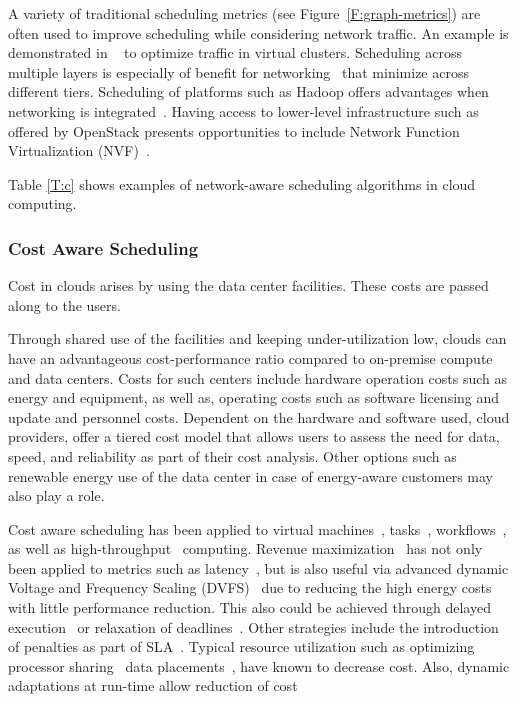 \documentclass[final,5p,times,twocolumn]{elsarticle}
\begin{document}
A variety of traditional scheduling metrics (see Figure~\ref{F:graph-metrics}) are often used to improve scheduling while considering network traffic. An example is demonstrated in ~\cite{yu2017survivable} to optimize traffic in virtual clusters. Scheduling across multiple layers is especially of benefit for networking~\cite{bi2015sla} that minimize across different tiers. Scheduling of platforms such as Hadoop offers advantages when networking is integrated~\cite{kondikoppa2012network}. Having access to lower-level infrastructure such as offered by OpenStack presents opportunities to include Network Function Virtualization (NVF)~\cite{lucrezia2015introducing}.

Table \ref{T:c} shows examples of network-aware scheduling algorithms in cloud computing.



%


\subsubsection{Cost Aware Scheduling}\label{sec:cost}


Cost in clouds arises by using the data center facilities. These costs are passed along to the users.

Through shared use of the facilities and keeping under-utilization low, clouds can have an advantageous cost-performance ratio compared to on-premise compute and data centers. Costs for such centers include hardware operation costs such as energy and equipment, as well as, operating costs such as software licensing and update and personnel costs. Dependent on the hardware and software used, cloud providers, offer a tiered cost model that allows users to assess the need for data, speed, and reliability as part of their cost analysis. Other options such as renewable energy use of the data center in case of energy-aware customers may also play a role.

Cost aware scheduling has been applied to virtual machines~\cite{yuan2017ttsa}, tasks~\cite{yuan2017temporal,zuo2015multi}, workflows~\cite{arabnejad2015cost,arabnejad2016budget}, as well as high-throughput~\cite{yuan2016cawsac} computing. Revenue maximization~\cite{yuan2018warm} has not only been applied to metrics such as latency~\cite{ghahramani2017toward}, but is also useful via advanced dynamic Voltage and Frequency Scaling (DVFS)~\cite{las10cloudsched,calheiros2014energy} due to reducing the high energy costs with little performance reduction. This also could be achieved through delayed execution~\cite{bi2016trs} or relaxation of deadlines~\cite{zhang2018dynamic}. Other strategies include the introduction of penalties as part of SLA~\cite{wu2012sla}. Typical resource utilization such as optimizing processor sharing~\cite{lee2012profit} data placements~\cite{lee2012profit}, have known to decrease cost. Also, dynamic adaptations at run-time allow reduction of cost~\cite{ari2013design}
\end{document}
